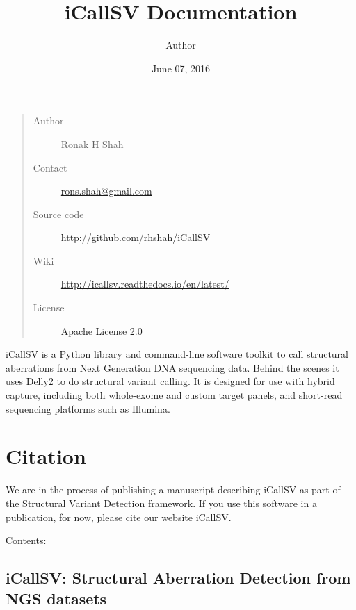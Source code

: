 \documentclass[letterpaper,10pt,english]{sphinxmanual}
\title{iCallSV Documentation}
\date{June 07, 2016}
\author{Author}
\begin{document}
\maketitle
\tableofcontents
{}\label{index::doc}

\begin{quote}\begin{description}
\item[{Author}] \leavevmode
Ronak H Shah

\item[{Contact}] \leavevmode
\href{mailto:rons.shah@gmail.com}{rons.shah@gmail.com}

\item[{Source code}] \leavevmode
\href{http://github.com/rhshah/iCallSV}{http://github.com/rhshah/iCallSV}

\item[{Wiki}] \leavevmode
\href{http://icallsv.readthedocs.io/en/latest/}{http://icallsv.readthedocs.io/en/latest/}

\item[{License}] \leavevmode
\href{http://www.apache.org/licenses/LICENSE-2.0}{Apache License 2.0}

\end{description}\end{quote}
\href{https://landscape.io/github/rhshah/iCallSV/master}{}\href{http://dx.doi.org/10.5281/zenodo.55009}{}
iCallSV is a Python library and command-line software toolkit to call structural aberrations from Next Generation DNA sequencing data. Behind the scenes it uses Delly2 to do structural variant calling. It is designed for use with hybrid capture, including both whole-exome and custom target panels, and
short-read sequencing platforms such as Illumina.


\chapter{Citation}
\label{index:citation}\label{index:icallsv-structural-aberration-detection-from-ngs-datasets}
We are in the process of publishing a manuscript describing iCallSV as part of the Structural Variant Detection framework.
If you use this software in a publication, for now, please cite our website \href{http://github.com/rhshah/iCallSV}{iCallSV}.

Contents:


\section{iCallSV: Structural Aberration Detection from NGS datasets}
\label{iCallSV::doc}\label{iCallSV:icallsv-structural-aberration-detection-from-ngs-datasets}
\end{document}
